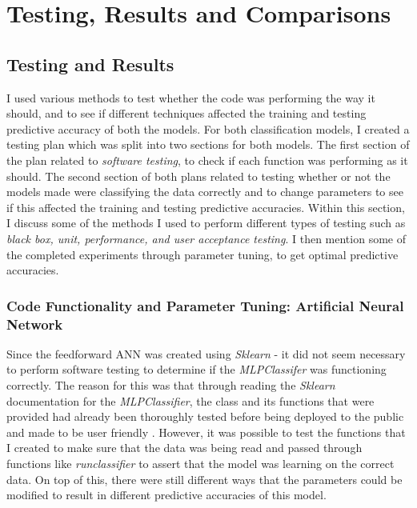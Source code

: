 \documentclass[11pt]{article}
\begin{document}
\section{Testing, Results and Comparisons} \label{sec:TRC}%
\subsection{Testing and Results}\label{subsec:TnR}
I used various methods to test whether the code was performing the way it should, and to see if different techniques affected the training and testing predictive accuracy of both the models. For both classification models, I created a testing plan which was split into two sections for both models. The first section of the plan related to \textit{software testing}, to check if each function was performing as it should. The second section of both plans related to testing whether or not the models made were classifying the data correctly and to change parameters to see if this affected the training and testing predictive accuracies. Within this section, I discuss some of the methods I used to perform different types of testing such as \textit{\textit{black box}, unit, performance, and user acceptance testing}. I then mention some of the completed experiments through parameter tuning, to get optimal predictive accuracies. 
\subsubsection{Code Functionality and Parameter Tuning: Artificial Neural Network}\label{subsubsec:CFPT}
Since the feedforward ANN was created using \textit{Sklearn} - it did not seem necessary to perform software testing to determine if the \textit{MLPClassifer} was functioning correctly. The reason for this was that through reading the \textit{Sklearn} documentation for the \textit{MLPClassifier}, the class and its functions that were provided had already been thoroughly tested before being deployed to the public and made to be user friendly \cite{ref-sklearn,ref-absk}. However, it was possible to test the functions that I created to make sure that the data was being read and passed through functions like \textit{run\textunderscore classifier} to assert that the model was learning on the correct data. On top of this, there were still different ways that the parameters could be modified to result in different predictive accuracies of this model. 
\end{document}
